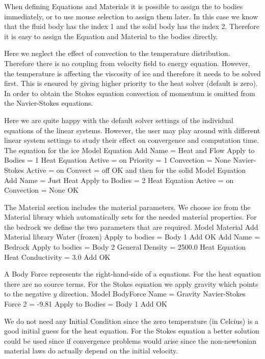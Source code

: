 When defining Equations and Materials it is possible to assign the to bodies immediately, or to use mouse
selection to assign them later. In this case we know that the fluid body has the index 1 and the 
solid body has the index 2. Therefore it is easy to assign the Equation and Material to the bodies directly. 

Here we neglect the effect of convection to the temperature distribution. Therefore there is no coupling 
from velocity field to energy equation. However, the temperature is affecting the viscosity of ice and therefore
it needs to be solved first. This is ensured by giving higher priority to the heat solver
(default is zero). In order to obtain the Stokes equation convection of momentum is omitted 
from the Navier-Stokes equations.	

Here we are quite happy with the default solver settings of the individual equations of the linear systems.
However, the user may play around with different linear system settings to study their effect on 
convergence and computation time.
\\
The equation for the ice
\ttbegin
Model
  Equation
    Add
    Name = Heat and Flow
    Apply to Bodies = 1
    Heat Equation
      Active = on
      Priority = 1
      Convection = None
    Navier-Stokes 
      Active = on
      Convect = off
    OK
\ttend        
and then for the solid
\ttbegin
Model
  Equation
    Add
    Name = Just Heat
    Apply to Bodies = 2
    Heat Equation
      Active = on
      Convection = None
    OK
\ttend    

The Material section includes the material parameters.
We choose ice from the Material library which automatically sets for the needed material properties. 
For the bedrock we define the two parameters that are required. 
\ttbegin
Model
  Material
    Add 
      Material library
        Water (frozen)
      Apply to bodies = Body 1 
      Add 
      OK
    Add
      Name = Bedrock
      Apply to bodies = Body 2
      General    
        Density = 2500.0
      Heat Equation
        Heat Conductivity = 3.0
      Add
      OK
\ttend


A Body Force represents the right-hand-side of a equations. For the heat equation there are
no source terms. For the Stokes equation we apply gravity which
points to the negative $y$ direction.
\ttbegin
Model
  BodyForce
    Name = Gravity
    Navier-Stokes
      Force 2 = -9.81
    Apply to Bodies = Body 1 
    Add
    OK
\ttend

We do not need any Initial Condition since the zero temperature (in Celcius) is a good initial
guess for the heat equation. For the Stokes equation a better solution could be used since 
if convergence problems would arise since the non-newtonian material laws do actually depend on the 
initial velocity.

